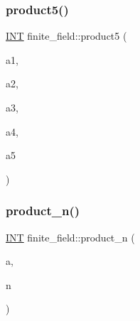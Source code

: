 \mbox{\label{classfinite__field_ab6f7ca45731ab77cd5eba74c23f8686f}} 
\subsubsection{\texorpdfstring{product5()}{product5()}}
{\footnotesize\ttfamily \mbox{\hyperlink{galois_8h_a09fddde158a3a20bd2dcadb609de11dc}{I\+NT}} finite\+\_\+field\+::product5 (\begin{DoxyParamCaption}\item[{\mbox{\hyperlink{galois_8h_a09fddde158a3a20bd2dcadb609de11dc}{I\+NT}}}]{a1,  }\item[{\mbox{\hyperlink{galois_8h_a09fddde158a3a20bd2dcadb609de11dc}{I\+NT}}}]{a2,  }\item[{\mbox{\hyperlink{galois_8h_a09fddde158a3a20bd2dcadb609de11dc}{I\+NT}}}]{a3,  }\item[{\mbox{\hyperlink{galois_8h_a09fddde158a3a20bd2dcadb609de11dc}{I\+NT}}}]{a4,  }\item[{\mbox{\hyperlink{galois_8h_a09fddde158a3a20bd2dcadb609de11dc}{I\+NT}}}]{a5 }\end{DoxyParamCaption})}

\mbox{\label{classfinite__field_a9107b694cc52701dc6d84cfc9e6fb336}} 
\subsubsection{\texorpdfstring{product\+\_\+n()}{product\_n()}}
{\footnotesize\ttfamily \mbox{\hyperlink{galois_8h_a09fddde158a3a20bd2dcadb609de11dc}{I\+NT}} finite\+\_\+field\+::product\+\_\+n (\begin{DoxyParamCaption}\item[{\mbox{\hyperlink{galois_8h_a09fddde158a3a20bd2dcadb609de11dc}{I\+NT}} $\ast$}]{a,  }\item[{\mbox{\hyperlink{galois_8h_a09fddde158a3a20bd2dcadb609de11dc}{I\+NT}}}]{n }\end{DoxyParamCaption})}

\mbox{\label{classfinite__field_a03e363ea6ce17fc19e288d49c36c375f}} 
